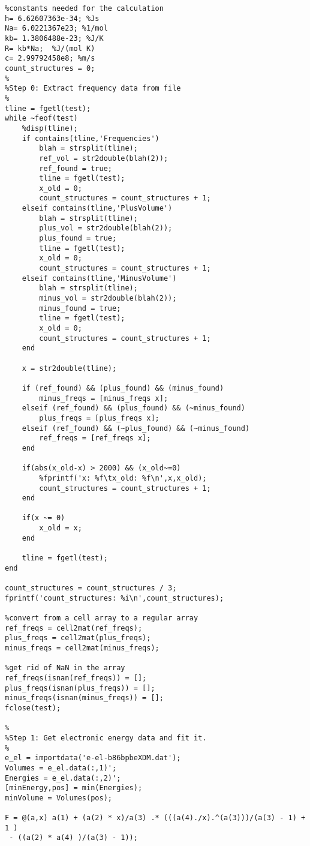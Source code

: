 \documentclass[11pt,letterpaper]{article}
\begin{document}
\begin{spacing}{1.0}
\begin{verbatim}
%constants needed for the calculation
h= 6.62607363e-34; %Js
Na= 6.0221367e23; %1/mol
kb= 1.3806488e-23; %J/K
R= kb*Na;  %J/(mol K)
c= 2.99792458e8; %m/s
count_structures = 0;
%
%Step 0: Extract frequency data from file
%
tline = fgetl(test);
while ~feof(test)
    %disp(tline);
    if contains(tline,'Frequencies')
        blah = strsplit(tline);
        ref_vol = str2double(blah(2));
        ref_found = true;
        tline = fgetl(test);
        x_old = 0;
        count_structures = count_structures + 1;
    elseif contains(tline,'PlusVolume')
        blah = strsplit(tline);
        plus_vol = str2double(blah(2));
        plus_found = true;
        tline = fgetl(test);
        x_old = 0;
        count_structures = count_structures + 1;
    elseif contains(tline,'MinusVolume')
        blah = strsplit(tline);
        minus_vol = str2double(blah(2));
        minus_found = true;
        tline = fgetl(test);
        x_old = 0;
        count_structures = count_structures + 1;
    end
    
    x = str2double(tline);
    
    if (ref_found) && (plus_found) && (minus_found)
        minus_freqs = [minus_freqs x];
    elseif (ref_found) && (plus_found) && (~minus_found)
        plus_freqs = [plus_freqs x];
    elseif (ref_found) && (~plus_found) && (~minus_found)
        ref_freqs = [ref_freqs x];        
    end
    
    if(abs(x_old-x) > 2000) && (x_old~=0)
        %fprintf('x: %f\tx_old: %f\n',x,x_old);
        count_structures = count_structures + 1;
    end
    
    if(x ~= 0)
        x_old = x;
    end
    
    tline = fgetl(test);
end

count_structures = count_structures / 3; 
fprintf('count_structures: %i\n',count_structures);

%convert from a cell array to a regular array
ref_freqs = cell2mat(ref_freqs);
plus_freqs = cell2mat(plus_freqs);
minus_freqs = cell2mat(minus_freqs);

%get rid of NaN in the array
ref_freqs(isnan(ref_freqs)) = [];
plus_freqs(isnan(plus_freqs)) = [];
minus_freqs(isnan(minus_freqs)) = [];
fclose(test);

%
%Step 1: Get electronic energy data and fit it.
%
e_el = importdata('e-el-b86bpbeXDM.dat');
Volumes = e_el.data(:,1)';
Energies = e_el.data(:,2)';
[minEnergy,pos] = min(Energies);
minVolume = Volumes(pos);

F = @(a,x) a(1) + (a(2) * x)/a(3) .* (((a(4)./x).^(a(3)))/(a(3) - 1) + 1 )
 - ((a(2) * a(4) )/(a(3) - 1));


\end{verbatim}
\end{spacing}
\end{document}
